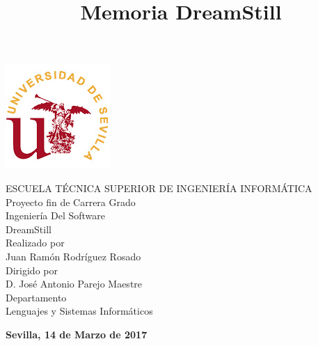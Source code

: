 \documentclass[11pt,openany]{book}
\title{Memoria DreamStill}
\begin{document}
 \begin{titlepage}
 \centering
  \includegraphics[scale=2.5]{logos/us}	

 \begin{center}\bf\sffamily
 
  {\normalsize ESCUELA T{\'E}CNICA SUPERIOR DE INGENIER{\'I}A INFORM{\'A}TICA}\\[1.5cm]
  {\large Proyecto fin de Carrera Grado}\\[1cm]
  {\large Ingeniería Del Software}\\[2cm]
  {\large DreamStill}\\[1.5cm]
  {\large Realizado por}\\
  {\large Juan Ramón Rodríguez Rosado}\\
  [1cm]
  {\large Dirigido por}\\
  {\large D. José Antonio Parejo Maestre}\\[1cm]
  {\large Departamento}\\
  {\large Lenguajes y Sistemas Informáticos}   
\end{center}
\vfill
 \begin{flushright}
  {\bf\sffamily\large Sevilla, {\large 14 de Marzo de 2017}}
 \end{flushright}

\end{titlepage}
\end{document}
